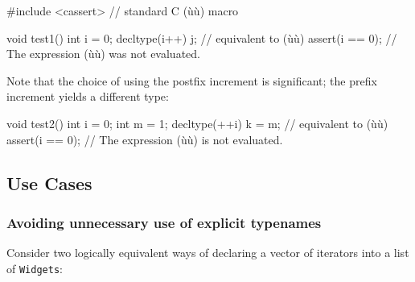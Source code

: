 \begin{emcppshiddenlisting}[emcppsbatch=e3]
#include <cassert>  // standard C (ù{}ù) macro
\end{emcppshiddenlisting}
\begin{emcppslisting}[emcppsbatch=e3]
void test1()
{
    int i = 0;
    decltype(i++) j;  // equivalent to (ù{}ù)
    assert(i == 0);   // The expression (ù{}ù) was not evaluated.
}
\end{emcppslisting}
Note that the choice of using the postfix increment is significant; the prefix increment yields a different type:
\begin{emcppslisting}[emcppsbatch=e3]
void test2()
{
    int i = 0;
    int m = 1;
    decltype(++i) k = m; // equivalent to (ù{}ù)
    assert(i == 0); // The expression (ù{}ù) is not evaluated.
}
\end{emcppslisting}

\subsection[Use Cases]{Use Cases}\label{use-cases-decltype}

\subsubsection[Avoiding unnecessary use of explicit typenames]{Avoiding unnecessary use of explicit typenames}\label{avoiding-unnecessary-use-of-explicit-typenames}

Consider two logically equivalent ways of declaring a vector of
iterators into a list of \lstinline!Widgets!:

